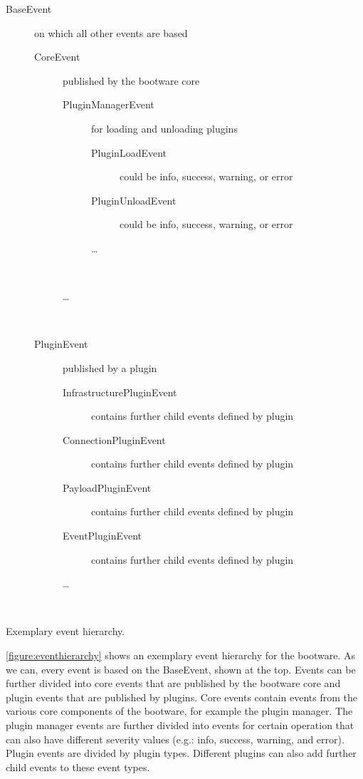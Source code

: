\vspace*{\baselineskip}
\begingroup
	\centering
	\captionsetup{type=figure}
	\begin{description}
		\item[BaseEvent] on which all other events are based
		\begin{description}
			\item[CoreEvent] published by the bootware core
			\begin{description}
				\item[PluginManagerEvent] for loading and unloading plugins
				\begin{description}
					\item[PluginLoadEvent] could be info, success, warning, or error
					\item[PluginUnloadEvent] could be info, success, warning, or error
					\item[\ldots] ~
				\end{description}
				\item[\ldots] ~
			\end{description}
		\end{description}
		\begin{description}
			\item[PluginEvent] published by a plugin
			\begin{description}
				\item[InfrastructurePluginEvent] contains further child events defined by plugin
				\item[ConnectionPluginEvent] contains further child events defined by plugin
				\item[PayloadPluginEvent] contains further child events defined by plugin
				\item[EventPluginEvent] contains further child events defined by plugin
				\item[\ldots] ~
			\end{description}
		\end{description}
	\end{description}
	\caption{Exemplary event hierarchy.}
	\label{figure:eventhierarchy}
\endgroup

\autoref{figure:eventhierarchy} shows an exemplary event hierarchy for the bootware.
As we can, every event is based on the BaseEvent, shown at the top.
Events can be further divided into core events that are published by the bootware core and plugin events that are published by plugins.
Core events contain events from the various core components of the bootware, for example the plugin manager.
The plugin manager events are further divided into events for certain operation that can also have different severity values (e.g.: info, success, warning, and error).
Plugin events are divided by plugin types.
Different plugins can also add further child events to these event types.
